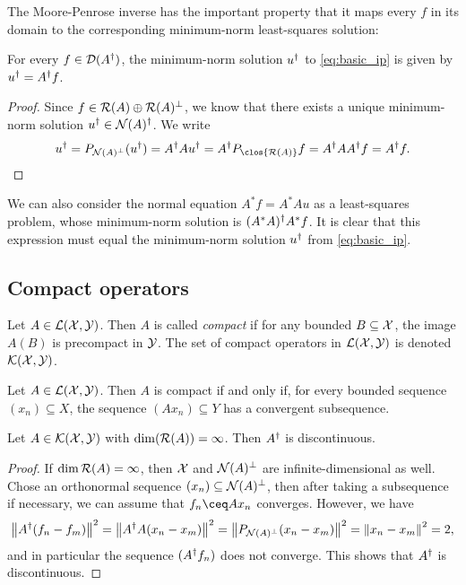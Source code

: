 The Moore-Penrose inverse has the important property that it maps every $f$ in its domain to the corresponding minimum-norm least-squares solution:
\begin{theorem}
    For every $f \in \operatorname{\mathcal D}(A^\dagger)$, the minimum-norm solution $u^\dagger$ to \cref{eq:basic_ip} is given by $u^\dagger = A^\dagger f$. 
\end{theorem}

\begin{proof}
    Since $f \in \operatorname{\mathcal R}(A) \oplus \operatorname{\mathcal R}(A)^\perp$, we know that there exists a unique minimum-norm solution $u^\dagger \in \operatorname{\mathcal N}(A)^\dagger$. We write
    \[
    u\D = P_{\Nul(A)\P}(u\D) = A\D A u\D = A\D P_{\clos{\Ran(A)}} f = A\D A A\D f = A\D f. 
    \]
\end{proof}

\begin{remark}
    We can also consider the normal equation $A^* f = A^* A u$ as a least-squares problem, whose minimum-norm solution is $(A^* A)^\dagger A^* f$. It is clear that this expression must equal the minimum-norm solution $u^\dagger$ from \cref{eq:basic_ip}. 
\end{remark}

\subsection{Compact operators}
\begin{definition}
    Let $A \in \mathcal L(\mathcal X, \mathcal Y)$. Then $A$ is called \emph{compact} if for any bounded $B \subseteq \mathcal X$, the image $A(B)$ is precompact in $\mathcal Y$. The set of compact operators in $\mathcal L(\mathcal X, \mathcal Y)$ is denoted $\mathcal K(\mathcal X, \mathcal Y)$. 
\end{definition}

\begin{lemma}
    Let $A \in \mathcal L(\mathcal X, \mathcal Y)$. Then $A$ is compact if and only if, for every bounded sequence $(x_n) \subseteq X$, the sequence $(Ax_n) \subseteq Y$ has a convergent subsequence. 
\end{lemma}

\begin{theorem}
    Let $A \in \mathcal K(\mathcal X, \mathcal Y)$ with $\dim(\operatorname{\mathcal R}(A)) = \infty$. Then $A^\dagger$ is discontinuous. 
\end{theorem}

\begin{proof}
    If $\dim\operatorname{\mathcal R}(A) = \infty$, then $\mathcal X$ and $\operatorname{\mathcal N}(A)^\perp$ are infinite-dimensional as well. Chose an orthonormal sequence $(x_n) \subseteq \operatorname{\mathcal N}(A)^\perp$, then after taking a subsequence if necessary, we can assume that $f_n \ceq Ax_n$ converges. However, we have
    \[
    \norm{A^\dagger(f_n - f_m)}^2 = \norm{A^\dagger A (x_n - x_m)}^2 = \norm{P_{\operatorname{\mathcal N}(A)^\perp} (x_n - x_m)}^2 = \norm{x_n -x_m}^2 = 2, 
    \]
    and in particular the sequence $(A^\dagger f_n)$ does not converge. This shows that $A^\dagger$ is discontinuous. 
\end{proof}

